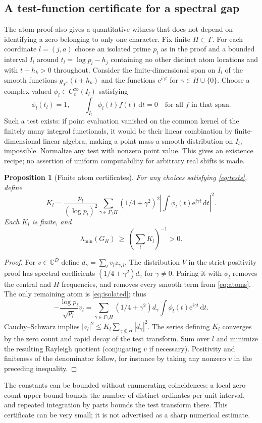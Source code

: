 \documentclass[11pt]{article}
\newtheorem{proposition}[theorem]{Proposition}
\theoremstyle{remark}\newtheorem{remark}[theorem]{Remark}
\newcommand{\C}{\mathbb C}
\newcommand{\dd}{\,\mathrm d}
\newcommand{\e}{\mathrm e}
\begin{document}
\subsection{A test-function certificate for a spectral gap}
The atom proof also gives a quantitative witness that does not depend on identifying a zero belonging to only one character. Fix finite $H\subset\Gamma$. For each coordinate $l=(j,a)$ choose an isolated prime $p_l$ as in the proof and a bounded interval $I_l$ around $t_l=\log p_l-h_j$ containing no other distinct atom locations and with $t+h_k>0$ throughout. Consider the finite-dimensional span on $I_l$ of the smooth functions $g_{\chi^*}(t+h_k)$ and the functions $\e^{i\gamma t}$ for $\gamma\in H\cup\{0\}$. Choose a complex-valued $\phi_l\in C_c^\infty(I_l)$ satisfying
\begin{equation}\label{eq:tests}
 \phi_l(t_l)=1,\qquad \int_{I_l}\phi_l(t)f(t)\dd t=0\quad\text{for all } f\text{ in that span}.
\end{equation}
Such a test exists: if point evaluation vanished on the common kernel of the finitely many integral functionals, it would be their linear combination by finite-dimensional linear algebra, making a point mass a smooth distribution on $I_l$, impossible. Normalize any test with nonzero point value. This gives an existence recipe; no assertion of uniform computability for arbitrary real shifts is made.

\begin{proposition}[Finite atom certificates]\label{prop:certificate}
For any choices satisfying \eqref{eq:tests}, define
\[
 K_l=\frac{p_l}{(\log p_l)^2}\sum_{\gamma\in\Gamma\setminus H}(1/4+\gamma^2)^2
 \left|\int\phi_l(t)\e^{i\gamma t}\dd t\right|^2.
\]
Each $K_l$ is finite, and
\begin{equation}\label{eq:certificate}
 \lambda_{\min}(G_H)\ \ge\ \left(\sum_l K_l\right)^{-1}>0.
\end{equation}
\end{proposition}
\begin{proof}
For $v\in\C^D$ define $d_\gamma=\sum_l v_l z_{\gamma,l}$. The distribution $V$ in the strict-positivity proof has spectral coefficients $(1/4+\gamma^2)d_\gamma$ for $\gamma\ne0$. Pairing it with $\phi_l$ removes the central and $H$ frequencies, and removes every smooth term from \eqref{eq:atoms}. The only remaining atom is \eqref{eq:isolated}; thus
\[
 -\frac{\log p_l}{\sqrt{p_l}}v_l
 =\sum_{\gamma\in\Gamma\setminus H}(1/4+\gamma^2)d_\gamma
 \int\phi_l(t)\e^{i\gamma t}\dd t.
\]
Cauchy--Schwarz implies $|v_l|^2\le K_l\sum_{\gamma\notin H}|d_\gamma|^2$. The series defining $K_l$ converges by the zero count and rapid decay of the test transform. Sum over $l$ and minimize the resulting Rayleigh quotient (conjugating $v$ if necessary). Positivity and finiteness of the denominator follow, for instance by taking any nonzero $v$ in the preceding inequality.
\end{proof}
The constants can be bounded without enumerating coincidences: a local zero-count upper bound bounds the number of distinct ordinates per unit interval, and repeated integration by parts bounds the test transform there. This certificate can be very small; it is not advertised as a sharp numerical estimate.
\end{document}
